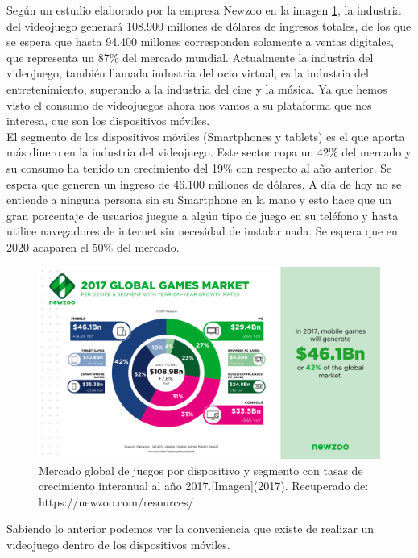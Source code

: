 			 Según un estudio elaborado por la empresa Newzoo en la imagen \ref{fig:newzooIndMun}, la industria del videojuego generará 108.900 millones de dólares de ingresos totales, de los que se espera que hasta 94.400 millones corresponden solamente a ventas digitales, que representa un 87\% del mercado mundial. Actualmente la industria del videojuego, también llamada industria del ocio virtual, es la industria del entretenimiento, superando a la industria del cine y la música. Ya que hemos visto el consumo de videojuegos ahora nos vamos a su plataforma que nos interesa, que son los dispositivos móviles.
			 \\[1pt]	
			 
			 El segmento de los dispositivos móviles (Smartphones y tablets) es el que aporta más dinero en la industria del videojuego. Este sector copa un 42\% del mercado y su consumo ha tenido un crecimiento del 19\% con respecto al año anterior. Se espera que generen un ingreso de 46.100 millones de dólares. A día de hoy no se entiende a ninguna persona sin su Smartphone en la mano y esto hace que un gran porcentaje de usuarios juegue a algún tipo de juego en su teléfono y hasta utilice navegadores de internet sin necesidad de instalar nada. Se espera que en 2020 acaparen el 50\% del mercado. \cite{vid01}
			 \\[1pt]   
			 
			 	\begin{figure}
			 	\centering
			 	\includegraphics[width=\textwidth]{03MarcoTeorico/imageR/newzooIndMun.png}
			 	\caption{Mercado global de juegos por dispositivo y segmento con tasas de crecimiento interanual al año 2017.[Imagen](2017). Recuperado de: https://newzoo.com/resources/}
			 	\label{fig:newzooIndMun}
			 \end{figure}	
		 
		 Sabiendo lo anterior podemos ver la conveniencia que existe de realizar un videojuego dentro de los dispositivos móviles.
			 
